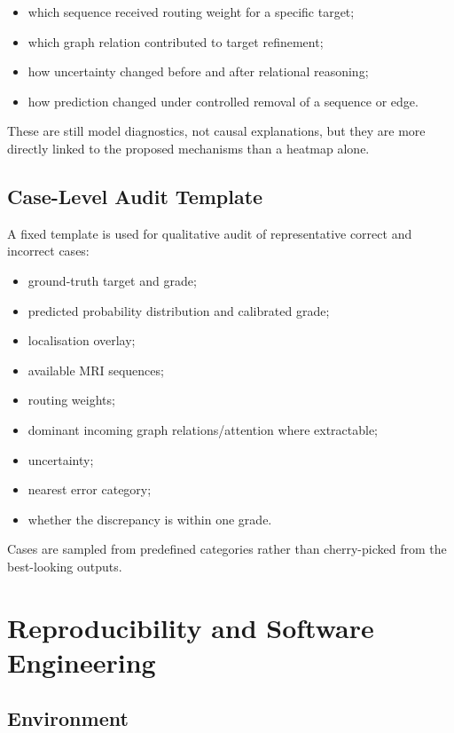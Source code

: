 \begin{itemize}
  \item which sequence received routing weight for a specific target;
  \item which graph relation contributed to target refinement;
  \item how uncertainty changed before and after relational reasoning;
  \item how prediction changed under controlled removal of a sequence or edge.
\end{itemize}

These are still model diagnostics, not causal explanations, but they are more
directly linked to the proposed mechanisms than a heatmap alone.

\subsection{Case-Level Audit Template}
\label{sec:method-case-audit}

A fixed template is used for qualitative audit of representative correct and
incorrect cases:

\begin{itemize}
  \item ground-truth target and grade;
  \item predicted probability distribution and calibrated grade;
  \item localisation overlay;
  \item available MRI sequences;
  \item routing weights;
  \item dominant incoming graph relations/attention where extractable;
  \item uncertainty;
  \item nearest error category;
  \item whether the discrepancy is within one grade.
\end{itemize}

Cases are sampled from predefined categories rather than cherry-picked from the
best-looking outputs.

\section{Reproducibility and Software Engineering}
\label{sec:method-reproducibility}

\subsection{Environment}
\label{sec:method-environment}

